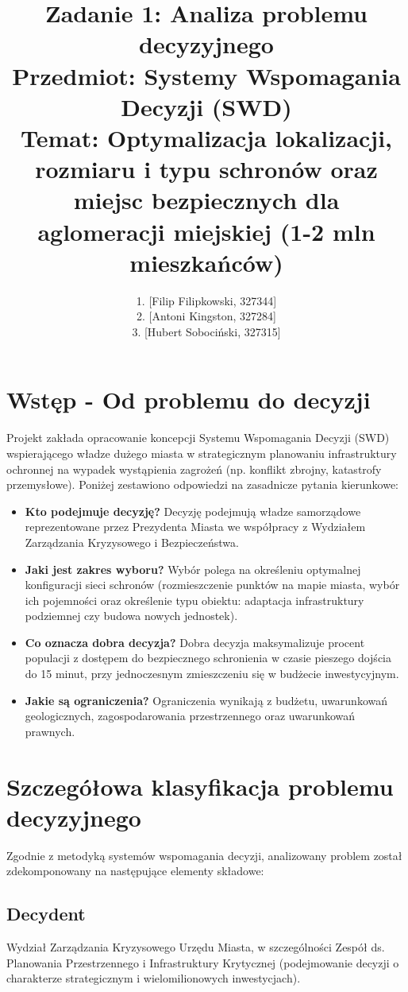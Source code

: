 \documentclass[12pt,a4paper]{article}
\title{\textbf{Zadanie 1: Analiza problemu decyzyjnego}\\
\large Przedmiot: Systemy Wspomagania Decyzji (SWD)\\
\vspace{0.5cm}
\Large Temat: Optymalizacja lokalizacji, rozmiaru i typu schronów oraz miejsc bezpiecznych dla aglomeracji miejskiej (1-2 mln mieszkańców)}
\author{
    1. [Filip Filipkowski, 327344] \\
    2. [Antoni Kingston, 327284] \\
    3. [Hubert Sobociński, 327315]
}
\date{}
\begin{document}
\maketitle

\section*{Wstęp - Od problemu do decyzji}
Projekt zakłada opracowanie koncepcji Systemu Wspomagania Decyzji (SWD) wspierającego władze dużego miasta w strategicznym planowaniu infrastruktury ochronnej na wypadek wystąpienia zagrożeń (np. konflikt zbrojny, katastrofy przemysłowe). Poniżej zestawiono odpowiedzi na zasadnicze pytania kierunkowe:

\begin{itemize}
    \item \textbf{Kto podejmuje decyzję?} Decyzję podejmują władze samorządowe reprezentowane przez Prezydenta Miasta we współpracy z Wydziałem Zarządzania Kryzysowego i Bezpieczeństwa.
    \item \textbf{Jaki jest zakres wyboru?} Wybór polega na określeniu optymalnej konfiguracji sieci schronów (rozmieszczenie punktów na mapie miasta, wybór ich pojemności oraz określenie typu obiektu: adaptacja infrastruktury podziemnej czy budowa nowych jednostek).
    \item \textbf{Co oznacza dobra decyzja?} Dobra decyzja maksymalizuje procent populacji z dostępem do bezpiecznego schronienia w czasie pieszego dojścia do 15 minut, przy jednoczesnym zmieszczeniu się w budżecie inwestycyjnym.
    \item \textbf{Jakie są ograniczenia?} Ograniczenia wynikają z budżetu, uwarunkowań geologicznych, zagospodarowania przestrzennego oraz uwarunkowań prawnych.
\end{itemize}

\section{Szczegółowa klasyfikacja problemu decyzyjnego}

Zgodnie z metodyką systemów wspomagania decyzji, analizowany problem został zdekomponowany na następujące elementy składowe:

\subsection{Decydent}
Wydział Zarządzania Kryzysowego Urzędu Miasta, w szczególności Zespół ds. Planowania Przestrzennego i Infrastruktury Krytycznej (podejmowanie decyzji o charakterze strategicznym i wielomilionowych inwestycjach).
\end{document}
